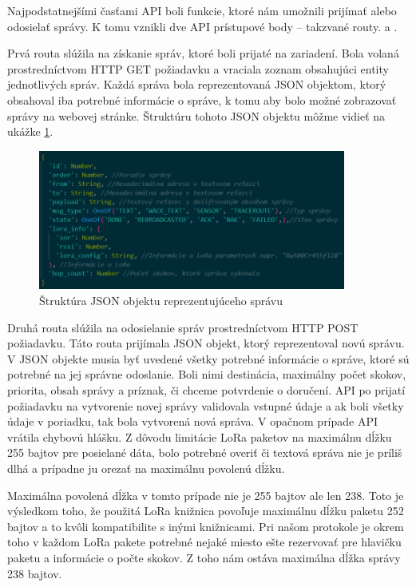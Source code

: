 \documentclass[slovak,master]{diploma}
\begin{document}
Najpodstatnejšími časťami API boli funkcie, ktoré nám umožnili prijímať alebo odosielať správy. K tomu vznikli dve 
API prístupové body -- takzvané routy.  a .

Prvá routa slúžila na získanie správ, ktoré boli prijaté na zariadení. Bola volaná prostredníctvom HTTP GET požiadavku a 
vraciala zoznam obsahujúci entity jednotlivých správ. Každá správa bola reprezentovaná JSON objektom, ktorý obsahoval 
iba potrebné informácie o správe, k tomu aby bolo možné zobrazovať správy na webovej stránke. Štruktúru tohoto JSON 
objektu môžme vidieť na ukážke \ref{fig:messageObj}.

\begin{figure}[h!]
	\centering
	\includegraphics[width=0.9\textwidth]{Figures/msgObject.png}
	\caption{Štruktúra JSON objektu reprezentujúceho správu}
	\label{fig:messageObj}
\end{figure}

Druhá routa slúžila na odosielanie správ prostredníctvom HTTP POST požiadavku. Táto routa prijímala JSON objekt, ktorý reprezentoval novú správu.
V JSON objekte musia byť uvedené všetky potrebné informácie o správe, ktoré sú potrebné na jej správne odoslanie. 
Boli nimi destinácia, maximálny počet skokov, priorita, obsah správy a príznak, či chceme potvrdenie o doručení. 
API po prijatí požiadavku na vytvorenie novej správy validovala vstupné údaje a ak boli všetky údaje v poriadku, tak bola vytvorená nová správa. V 
opačnom prípade API vrátila chybovú hlášku. Z dôvodu limitácie LoRa paketov na maximálnu dĺžku 255 bajtov pre posielané dáta, bolo potrebné overiť či textová správa 
nie je príliš dlhá a prípadne ju orezať na maximálnu povolenú dĺžku.

Maximálna povolená dĺžka v tomto prípade nie je 255 bajtov ale len 238. Toto je výsledkom toho, 
že použitá LoRa knižnica povoľuje maximálnu dĺžku paketu 252 bajtov a to kvôli kompatibilite s inými knižnicami.
Pri našom protokole je okrem toho v každom LoRa pakete potrebné nejaké miesto ešte rezervovať pre hlavičku paketu a informácie o počte skokov.
Z toho nám ostáva maximálna dĺžka správy 238 bajtov.
\end{document}
